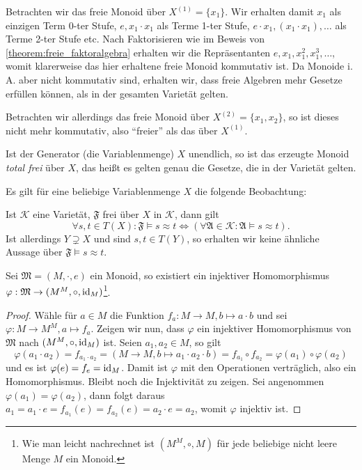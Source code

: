 \begin{remark}
    Betrachten wir das freie Monoid über $X^{(1)} = \{x_1\}$. Wir erhalten damit $x_1$ als einzigen Term 0-ter Stufe, $e, x_1 \cdot x_1$ als Terme 1-ter Stufe, $e \cdot x_1, (x_1 \cdot x_1), \ldots$ als Terme 2-ter Stufe etc. Nach Faktorisieren wie im Beweis von \cref{theorem:freie_faktoralgebra} erhalten wir die Repräsentanten $e, x_1, x_1^2, x_1^3, \ldots$, womit klarerweise das hier erhaltene freie Monoid kommutativ ist. Da Monoide i. A. aber nicht kommutativ sind, erhalten wir, dass freie Algebren mehr Gesetze erfüllen können, als in der gesamten Varietät gelten. 
    
    Betrachten wir allerdings das freie Monoid über $X^{(2)} = \{x_1, x_2\}$, so ist dieses nicht mehr kommutativ, also ``freier'' als das über $X^{(1)}$. 

    Ist der Generator (die Variablenmenge) $X$ unendlich, so ist das erzeugte Monoid \emph{total frei} über $X$, das heißt es gelten genau die Gesetze, die in der Varietät gelten.
\end{remark}

\begin{remark}
   Es gilt für eine beliebige Variablenmenge $X$ die folgende Beobachtung:

    Ist $\mathcal{K}$ eine Varietät, $\mathfrak{F}$ frei über $X$ in $\mathcal{K}$, dann gilt $$\forall s,t \in T(X): \mathfrak{F} \models s\approx t \Leftrightarrow \left(\forall \mathfrak{A} \in \mathcal{K}: \mathfrak{A} \models s \approx t\right).$$ 
    Ist allerdings $Y \supsetneq X$ und sind $s,t \in T(Y)$, so erhalten wir keine ähnliche Aussage über $\mathfrak{F} \models s \approx t$.
\end{remark}

\begin{theorem}\label{theorem:darstellungssatz-cayley-monoid}
    Sei $\mathfrak{M} = (M, \cdot, e)$ ein Monoid, so existiert ein injektiver Homomorphismus $\varphi: \mathfrak{M} \to (M^M, \circ, \operatorname{id}_M)$\footnote{Wie man leicht nachrechnet ist $(M^M,\circ,M)$ für jede beliebige nicht leere Menge $M$ ein Monoid.}.
\end{theorem}
\begin{proof}
    Wähle für $a \in M$ die Funktion $f_a: M \to M, b \mapsto a \cdot b$ und sei $\varphi: M \to M^M, a \mapsto f_a$. Zeigen wir nun, dass $\varphi$ ein injektiver Homomorphismus von $\mathfrak{M}$ nach $(M^M, \circ, \operatorname{id}_M)$ ist. Seien $a_1, a_2 \in M$, so gilt $$\varphi(a_1 \cdot a_2) = f_{a_1 \cdot a_2} = (M \to M, b \mapsto a_1 \cdot a_2 \cdot b) = f_{a_1} \circ f_{a_2} = \varphi(a_1) \circ \varphi(a_2)$$
    und es ist $\varphi(e) = f_e = \operatorname{id}_M$. Damit ist $\varphi$ mit den Operationen verträglich, also ein Homomorphismus. Bleibt noch die Injektivität zu zeigen. Sei angenommen $\varphi(a_1) = \varphi(a_2)$, dann folgt daraus $a_1 = a_1 \cdot e = f_{a_1}(e) = f_{a_2}(e) = a_2 \cdot e = a_2$, womit $\varphi$ injektiv ist.
\end{proof}

